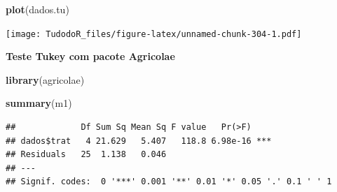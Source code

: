 \documentclass[
]{book}
\newenvironment{Shaded}{\begin{snugshade}}{\end{snugshade}}
\newcommand{\CommentTok}[1]{\textcolor[rgb]{0.56,0.35,0.01}{\textit{#1}}}
\newcommand{\DataTypeTok}[1]{\textcolor[rgb]{0.13,0.29,0.53}{#1}}
\newcommand{\FloatTok}[1]{\textcolor[rgb]{0.00,0.00,0.81}{#1}}
\newcommand{\KeywordTok}[1]{\textcolor[rgb]{0.13,0.29,0.53}{\textbf{#1}}}
\newcommand{\NormalTok}[1]{#1}
\newcommand{\OperatorTok}[1]{\textcolor[rgb]{0.81,0.36,0.00}{\textbf{#1}}}
\newcommand{\StringTok}[1]{\textcolor[rgb]{0.31,0.60,0.02}{#1}}
\begin{document}
\begin{Shaded}
\begin{Highlighting}[]
\KeywordTok{plot}\NormalTok{(dados.tu)}
\end{Highlighting}
\end{Shaded}

\texttt{[image: TudodoR\_files/figure-latex/unnamed-chunk-304-1.pdf]}

\textbf{Teste Tukey com pacote Agricolae}

\begin{Shaded}
\begin{Highlighting}[]
\KeywordTok{library}\NormalTok{(agricolae)}
\end{Highlighting}
\end{Shaded}

\begin{Shaded}
\begin{Highlighting}[]
\KeywordTok{summary}\NormalTok{(m1)}
\end{Highlighting}
\end{Shaded}

\begin{verbatim}
##             Df Sum Sq Mean Sq F value   Pr(>F)    
## dados$trat   4 21.629   5.407   118.8 6.98e-16 ***
## Residuals   25  1.138   0.046                     
## ---
## Signif. codes:  0 '***' 0.001 '**' 0.01 '*' 0.05 '.' 0.1 ' ' 1
\end{verbatim}

\begin{Shaded}
\end{Shaded}
\end{document}
